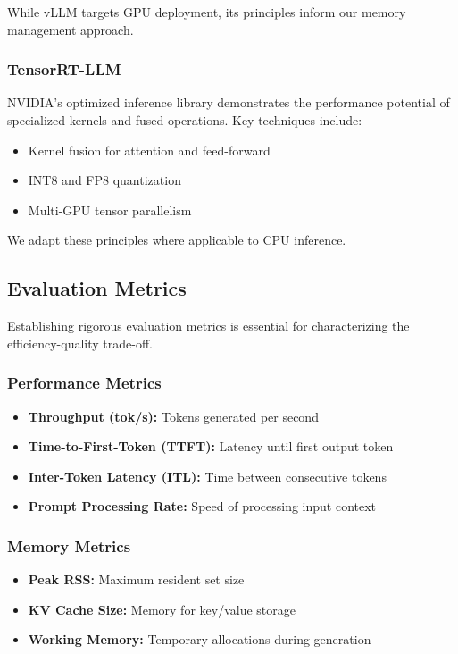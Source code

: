 While vLLM targets GPU deployment, its principles inform our memory management approach.

\subsubsection{TensorRT-LLM}

NVIDIA's optimized inference library \cite{nvidia2023tensorrt} demonstrates the performance potential of specialized kernels and fused operations. Key techniques include:

\begin{itemize}
    \item Kernel fusion for attention and feed-forward
    \item INT8 and FP8 quantization
    \item Multi-GPU tensor parallelism
\end{itemize}

We adapt these principles where applicable to CPU inference.

\subsection{Evaluation Metrics}

Establishing rigorous evaluation metrics is essential for characterizing the efficiency-quality trade-off.

\subsubsection{Performance Metrics}

\begin{itemize}
    \item \textbf{Throughput (tok/s):} Tokens generated per second
    \item \textbf{Time-to-First-Token (TTFT):} Latency until first output token
    \item \textbf{Inter-Token Latency (ITL):} Time between consecutive tokens
    \item \textbf{Prompt Processing Rate:} Speed of processing input context
\end{itemize}

\subsubsection{Memory Metrics}

\begin{itemize}
    \item \textbf{Peak RSS:} Maximum resident set size
    \item \textbf{KV Cache Size:} Memory for key/value storage
    \item \textbf{Working Memory:} Temporary allocations during generation
\end{itemize}

